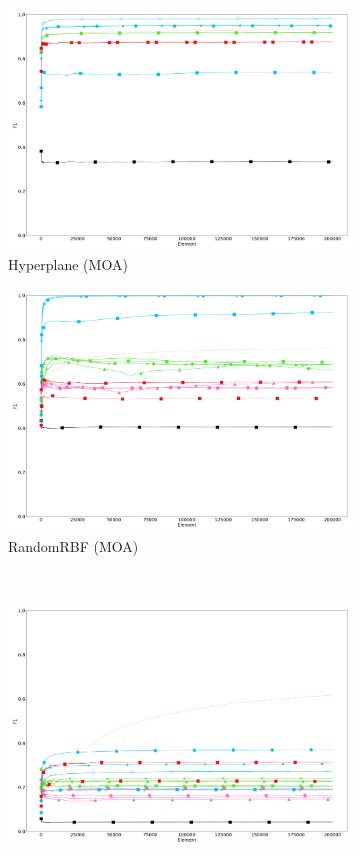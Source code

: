 \begin{figure}
\begin{subfigure}[t]{.49\linewidth}
		\includegraphics[width=\linewidth]{figures/results/dataset_1_f1.png}
		\caption{Hyperplane (MOA)}
		\label{fig:f1-dataset_1}
	\end{subfigure}
	\hfill
	\begin{subfigure}[t]{.49\linewidth}
		\includegraphics[width=\linewidth]{figures/results/dataset_2_f1.png}
		\caption{RandomRBF (MOA)}
		\label{fig:f1-dataset_2}
	\end{subfigure}\\
	\begin{subfigure}[t]{.49\linewidth}
		\includegraphics[width=\linewidth]{figures/results/dataset_3_f1.png}

\end{subfigure}
\end{figure}
